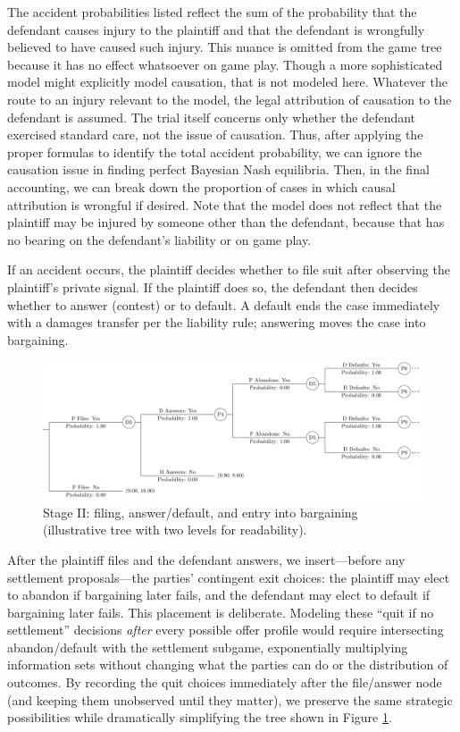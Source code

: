 \documentclass{article}
\begin{document}
The accident probabilities listed reflect the sum of the probability that the defendant causes injury to the plaintiff and that the defendant is wrongfully believed to have caused such injury. This nuance is omitted from the game tree because it has no effect whatsoever on game play. Though a more sophisticated model might explicitly model causation, that is not modeled here. Whatever the route to an injury relevant to the model, the legal attribution of causation to the defendant is assumed. The trial itself concerns only whether the defendant exercised standard care, not the issue of causation. Thus, after applying the proper formulas to identify the total accident probability, we can ignore the causation issue in finding perfect Bayesian Nash equilibria. Then, in the final accounting, we can break down the proportion of cases in which causal attribution is wrongful if desired. Note that the model does not reflect that the plaintiff may be injured by someone other than the defendant, because that has no bearing on the defendant's liability or on game play.

If an accident occurs, the plaintiff decides whether to file suit after observing the plaintiff's private signal. If the plaintiff does so, the defendant then decides whether to answer (contest) or to default. A default ends the case immediately with a damages transfer per the liability rule; answering moves the case into bargaining.

  \begin{figure}[t]
    \centering
    \includegraphics[width=\textwidth]{../Figures/smalltree_mid.pdf}
    \caption{Stage II: filing, answer/default, and entry into bargaining (illustrative tree with two levels for readability).}
    \label{fig:smalltree_mid.pdf}
  \end{figure}

After the plaintiff files and the defendant answers, we insert—before any settlement proposals—the parties’ contingent exit choices: the plaintiff may elect to abandon if bargaining later fails, and the defendant may elect to default if bargaining later fails. This placement is deliberate. Modeling these “quit if no settlement” decisions \emph{after} every possible offer profile would require intersecting abandon/default with the settlement subgame, exponentially multiplying information sets without changing what the parties can do or the distribution of outcomes. By recording the quit choices immediately after the file/answer node (and keeping them unobserved until they matter), we preserve the same strategic possibilities while dramatically simplifying the tree shown in Figure \ref{fig:smalltree_mid.pdf}.
\end{document}
